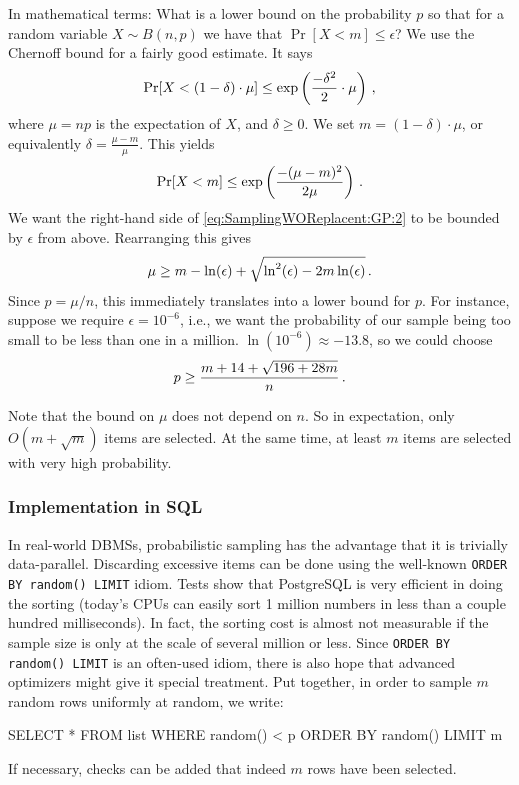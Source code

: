 \documentclass[letterpaper,11pt]{scrreprt}
\numberwithin{equation}{section}
\newcommand{\SiM}{\mathchoice{\,}{}{}{}}
\theoremstyle{algorithm}
\begin{document}
In mathematical terms: What is a lower bound on the probability $p$ so that for a random variable $X \sim B(n,p)$ we have that $\Pr[X < m] \leq \epsilon$? We use the Chernoff bound for a fairly good estimate. It says
%
\begin{align*}
	\Pr[X < (1 - \delta) \cdot \mu] \leq \exp\left( \frac{-\delta^2}{2} \cdot \mu \right)
	\SiM,
\end{align*}
where $\mu = np$ is the expectation of $X$, and $\delta \geq 0$. We set $m = (1 - \delta) \cdot \mu$, or equivalently $\delta = \frac{\mu - m}{\mu}$.
%
This yields
\begin{align}
	\Pr[X < m] \leq \exp\left( \frac{-(\mu - m)^2}{2 \mu} \right)
	\SiM. \label{eq:SamplingWOReplacent:GP:2}
\end{align}
%
We want the right-hand side of \eqref{eq:SamplingWOReplacent:GP:2} to be bounded by $\epsilon$ from above. Rearranging this gives
\begin{align*}
	\mu \geq m - \ln(\epsilon) + \sqrt{\ln^2(\epsilon) - 2 m \ln(\epsilon)}
	\SiM.
\end{align*}
Since $p = \mu / n$, this immediately translates into a lower bound for $p$. For instance, suppose we require $\epsilon = 10^{-6}$, i.e., we want the probability of our sample being too small to be less than one in a million. $\ln(10^{-6}) \approx -13.8$, so we could choose
\begin{align*}
	p \geq \frac{m + 14 + \sqrt{196 + 28m}}{n}
	\SiM.
\end{align*}

Note that the bound on $\mu$ does not depend on $n$. So in expectation, only $O(m + \sqrt m)$ items are selected. At the same time, at least $m$ items are selected with very high probability.

\subsubsection{Implementation in SQL}

In real-world DBMSs, probabilistic sampling has the advantage that it is trivially data-parallel. Discarding excessive items can be done using the well-known \texttt{ORDER BY random() LIMIT} idiom. Tests show that PostgreSQL is very efficient in doing the sorting (today's CPUs can easily sort 1 million numbers in less than a couple hundred milliseconds). In fact, the sorting cost is almost not measurable if the sample size is only at the scale of several million or less. Since \texttt{ORDER BY random() LIMIT} is an often-used idiom, there is also hope that advanced optimizers might give it special treatment. Put together, in order to sample $m$ random rows uniformly at random, we write:
\begin{sqlcode}
	SELECT * FROM list WHERE random() < p ORDER BY random() LIMIT m
\end{sqlcode}
If necessary, checks can be added that indeed $m$ rows have been selected.
\end{document}
